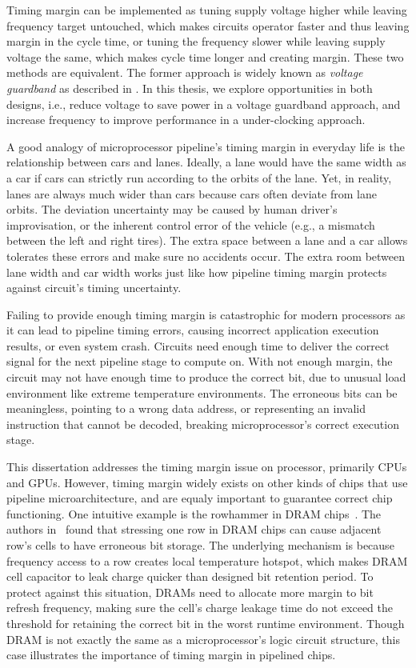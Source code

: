 Timing margin can be implemented as tuning supply voltage higher while leaving frequency target untouched, which makes circuits operator faster and thus leaving margin in the cycle time, or tuning the frequency slower while leaving supply voltage the same, which makes cycle time longer and creating margin. These two methods are equivalent. The former approach is widely known as \textit{voltage guardband} as described in . In this thesis, we explore opportunities in both designs, i.e., reduce voltage to save power in a voltage guardband approach, and increase frequency to improve performance in a under-clocking approach.

A good analogy of microprocessor pipeline's timing margin in everyday life is the relationship between cars and lanes. Ideally, a lane would have the same width as a car if cars can strictly run according to the orbits of the lane. Yet, in reality, lanes are always much wider than cars because cars often deviate from lane orbits. The deviation uncertainty may be caused by human driver's improvisation, or the inherent control error of the vehicle (e.g., a mismatch between the left and right tires). The extra space between a lane and a car allows tolerates these errors and make sure no accidents occur. The extra room between lane width and car width works just like how pipeline timing margin protects against circuit's timing uncertainty.

Failing to provide enough timing margin is catastrophic for modern processors as it can lead to pipeline timing errors, causing incorrect application execution results, or even system crash. Circuits need enough time to deliver the correct signal for the next pipeline stage to compute on. With not enough margin, the circuit may not have enough time to produce the correct bit, due to unusual load environment like extreme temperature environments. The erroneous bits can be meaningless, pointing to a wrong data address, or representing an invalid instruction that cannot be decoded, breaking microprocessor's correct execution stage.

This dissertation addresses the timing margin issue on processor, primarily CPUs and GPUs. However, timing margin widely exists on other kinds of chips that use pipeline microarchitecture, and are equaly important to guarantee correct chip functioning. One intuitive example is the rowhammer in DRAM chips~\cite{kim2014flipping}. The authors in~\cite{kim2014flipping} found that stressing one row in DRAM chips can cause adjacent row's cells to have erroneous bit storage. The underlying mechanism is because frequency access to a row creates local temperature hotspot, which makes DRAM cell capacitor to leak charge quicker than designed bit retention period. To protect against this situation, DRAMs need to allocate more margin to bit refresh frequency, making sure the cell's charge leakage time do not exceed the threshold for retaining the correct bit in the worst runtime environment. Though DRAM is not exactly the same as a microprocessor's logic circuit structure, this case illustrates the importance of timing margin in pipelined chips.

